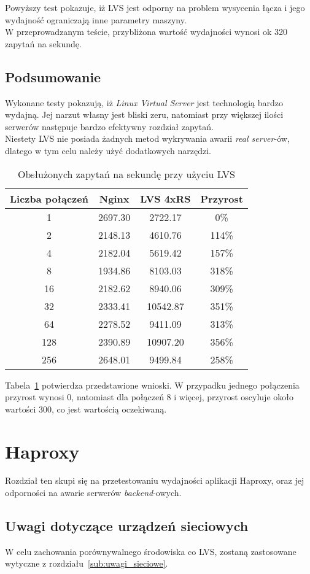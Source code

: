Powyższy test pokazuje, iż LVS jest odporny na problem wysycenia łącza i jego wydajność ograniczają inne parametry maszyny.\\
W przeprowadzanym teście, przybliżona wartość wydajności wynosi ok 320 zapytań na sekundę.
\subsection{Podsumowanie}
Wykonane testy pokazują, iż \textit{Linux Virtual Server} jest technologią bardzo wydajną.
Jej narzut własny jest bliski zeru, natomiast przy większej ilości serwerów następuje bardzo efektywny rozdział zapytań.\\
Niestety LVS nie posiada żadnych metod wykrywania awarii \textit{real server}-ów, dlatego w tym celu należy użyć dodatkowych narzędzi.
\begin{table}[h]
\centering
\begin{tabular}{cccc}
	\toprule
	Liczba połączeń & Nginx & LVS 4xRS & Przyrost\\
	\midrule
	\midrule
	1&2697.30&2722.17&0\%\\
	\midrule
	2&2148.13&4610.76&114\%\\
	\midrule
	4&2182.04&5619.42&157\%\\
	\midrule
	8&1934.86&8103.03&318\%\\
	\midrule
	16&2182.62&8940.06&309\%\\
	\midrule
	32&2333.41&10542.87&351\%\\
	\midrule
	64&2278.52&9411.09&313\%\\
	\midrule
	128&2390.89&10907.20&356\%\\
	\midrule
	256&2648.01&9499.84&258\%\\
	\bottomrule
\end{tabular}
\caption{Obsłużonych zapytań na sekundę przy użyciu LVS}
\label{tab:test_lvs}
\end{table}
Tabela~\ref{tab:test_lvs} potwierdza przedstawione wnioski.
W przypadku jednego połączenia przyrost wynosi 0, natomiast dla połączeń 8 i więcej, przyrost oscyluje około wartości 300, co jest wartością oczekiwaną.
\section{Haproxy}
Rozdział ten skupi się na przetestowaniu wydajności aplikacji Haproxy, oraz jej odporności na awarie serwerów \textit{backend}-owych.
\subsection{Uwagi dotyczące urządzeń sieciowych}
W celu zachowania porównywalnego środowiska co LVS, zostaną zastosowane wytyczne z rozdziału~\ref{sub:uwagi_sieciowe}.
